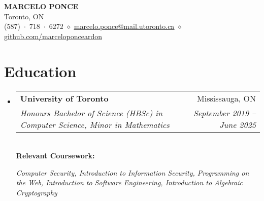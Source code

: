 \documentclass[letterpaper,11pt]{article}
\makeatletter
\newcommand{\resumeSubheading}[4]{
  \vspace{-2pt}\item
    \begin{tabular*}{0.97\textwidth}[t]{l@{\extracolsep{\fill}}r}
      \textbf{#1} & #2 \\
      \textit{\small#3} & \textit{\small #4} \\
    \end{tabular*}\vspace{-7pt}
}
\newcommand{\resumeSubHeadingListStart}{\begin{itemize}[leftmargin=0.15in, label={}]}
\newcommand{\resumeSubHeadingListEnd}{\end{itemize}}
\makeatother
\begin{document}

\begin{center}
    \textbf{\Huge \scshape MARCELO PONCE} \\ \vspace{1pt}
    \small Toronto, ON \\
    \small (587)~$\cdot$~718~$\cdot$~6272 $\diamond$ \href{mailto:marcelo.ponce@mail.utoronto.ca}{\underline{marcelo.ponce@mail.utoronto.ca}} $\diamond$
    \href{https://github.com/marceloponceardon}{\underline{github.com/marceloponceardon}}
\end{center}


\section{Education}
  \resumeSubHeadingListStart
    \resumeSubheading
      {University of Toronto}{Mississauga, ON}
      {Honours Bachelor of Science (HBSc) in Computer Science, Minor in Mathematics}{September 2019 -- June 2025} \\
      \vspace{8pt}
      \textbf{Relevant Coursework:} \\
      {\it
	      Computer Security,
	      Introduction to Information Security,
	      Programming on the Web,
	      Introduction to Software Engineering,
	      Introduction to Algebraic Cryptography

      }
  \resumeSubHeadingListEnd
\end{document}
